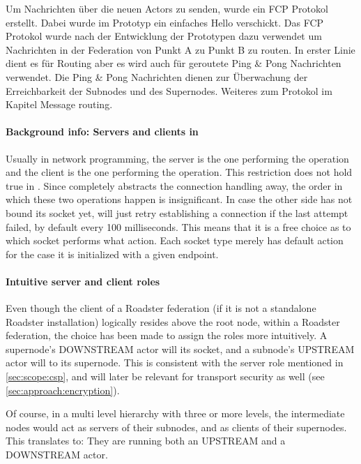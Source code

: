 Um Nachrichten über die neuen Actors zu senden, wurde ein FCP Protokol
erstellt. Dabei wurde im Prototyp ein einfaches Hello verschickt.
Das FCP Protokol wurde nach der Entwicklung der Prototypen dazu verwendet um Nachrichten 
in der Federation von Punkt A zu Punkt B zu routen. In erster Linie dient es für Routing aber es wird auch für geroutete
Ping \& Pong Nachrichten verwendet. Die Ping \& Pong Nachrichten
dienen zur Überwachung der Erreichbarkeit der Subnodes und des Supernodes.
Weiteres zum Protokol im Kapitel Message routing.


\paragraph{Background info: Servers and clients in \zmq}
Usually in network programming, the server is the one performing the
 operation and the client is the one performing the 
operation. This restriction does not hold true in \zmq. Since \zmq completely
abstracts the connection handling away, the order in which these two operations
happen is insignificant. In case the other side has not bound its socket
yet, \zmq will just retry establishing a connection if the last attempt failed,
by default every 100 milliseconds. This means that it is a free choice as to which socket
performs what action. Each socket type merely has default action for the case
it is initialized with a given endpoint.

\paragraph{Intuitive server and client roles}
Even though the client of a Roadster federation (if it is not a standalone
Roadster installation) logically resides above the root node, within a Roadster
federation, the choice has been made to assign the roles more intuitively. A
supernode's DOWNSTREAM actor will  its socket, and a subnode's
UPSTREAM actor will  to its supernode. This is consistent
with the server role mentioned in \autoref{sec:scope:csp}, and will later be
relevant for transport security as well (see \autoref{sec:approach:encryption}).

Of course, in a multi level hierarchy with three or more levels, the
intermediate nodes would act as servers of their subnodes, and as clients of
their supernodes. This translates to: They are running both an UPSTREAM and a DOWNSTREAM
actor.

